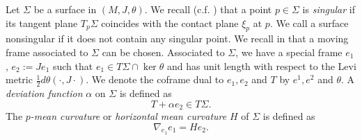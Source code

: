 \documentclass{amsart}
\theoremstyle{Corollary}
\numberwithin{equation}{section}
\begin{document}
Let $\Sigma$ be a surface in $(M,J,\theta)$. 
We recall (c.f. \cite{CHMY}) that a point $p\in \Sigma$
is \textit{singular} 
if its tangent plane $T_p\Sigma$ coincides 
with the contact plane $\xi_p$ at $p$. 
We call a surface nonsingular if 
it does not contain any singular point. 
We recall in \cite{CHMY}
that a moving frame associated to $\Sigma$ can be chosen. 
Associated to $\Sigma$, 
we have a special frame $e_1$, $e_2:=Je_1$ such that 
$e_1\in T\Sigma\cap \ker\theta$
and has unit length 
with respect to the Levi metric $\frac{1}{2}d\theta(\cdot,J\cdot)$.
We denote the coframe dual to $e_1, e_2$ and $T$ 
by $e^1,e^2$ and $\theta$. 
A \textit{deviation function} $\alpha$ on $\Sigma$ is defined as 
$$T+\alpha e_2\in T\Sigma.$$
The \textit{$p$-mean curvature} or \textit{horizontal mean curvature}
$H$ of $\Sigma$ is defined as 
$$\nabla_{e_1}e_1=H e_2.$$
\end{document}
